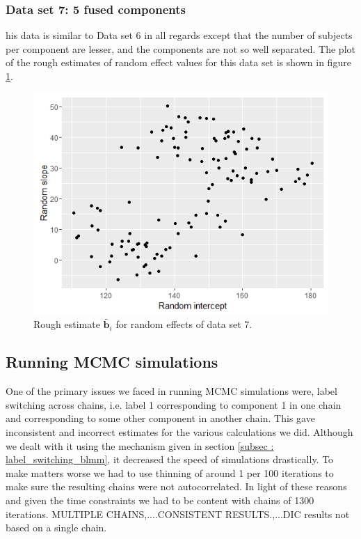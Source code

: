 \subsubsection{Data set 7: 5 fused components}
\label{subsubsec : ds_5fused}
his data is similar to Data set 6 in all regards except that the number of subjects per component are lesser, and the components are not so well separated. The plot of the rough estimates of random effect values for this data set is shown in figure \ref{fig : ds_5fused_randplot}.

\begin{figure}[!htb]
\centering
	\includegraphics[scale=0.5]{mainmatter/chapter_5_simulation_study/ds_5fused_randplot.png}
	\caption{Rough estimate $\tilde{\boldsymbol{b}_i}$ for random effects of data set 7.}
	\label{fig : ds_5fused_randplot}    
\end{figure}


\subsection{Running MCMC simulations}
One of the primary issues we faced in running MCMC simulations were, label switching across chains, i.e. label 1 corresponding to component 1 in one chain and corresponding to some other component in another chain. This gave inconsistent and incorrect estimates for the various calculations we did. Although we dealt with it using the mechanism given in section \ref{subsec : label_switching_blmm}, it decreased the speed of simulations drastically. To make matters worse we had to use thinning of around 1 per 100 iterations to make sure the resulting chains were not autocorrelated. In light of these reasons and given the time constraints we had to be content with chains of 1300 iterations. MULTIPLE CHAINS,....CONSISTENT RESULTS.,...DIC results not based on a single chain.


